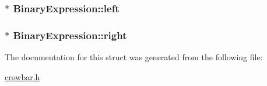 \subsubsection[{left}]{$\ast$ Binary\+Expression\+::left}\label{struct_binary_expression_aa9afb47a0f44456caa7094ff4de7e2e3}
\hypertarget{struct_binary_expression_a22065ee718926701c8f1d70080b61636}{}
\subsubsection[{right}]{$\ast$ Binary\+Expression\+::right}\label{struct_binary_expression_a22065ee718926701c8f1d70080b61636}


The documentation for this struct was generated from the following file\+:\begin{DoxyCompactItemize}
\item 
\hyperlink{crowbar_8h}{crowbar.\+h}\end{DoxyCompactItemize}

